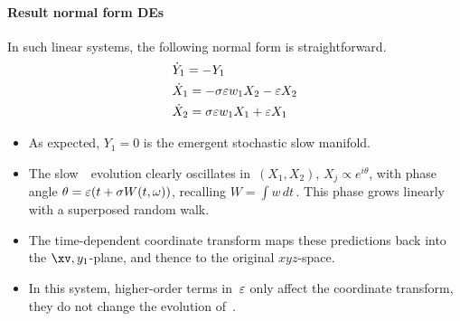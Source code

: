 \paragraph{Result normal form DEs}
In such linear systems, the following normal form is straightforward.
\begin{align*}&
\dot Y_{1}=-Y_{1}
\\&
\dot X_{1}=-\sigma  \varepsilon w_{1} X_{2}-\varepsilon X_{2}
\\&
\dot X_{2}=\sigma  \varepsilon w_{1} X_{1}+\varepsilon X_{1}
\end{align*}
\begin{itemize}
\item As expected, \(Y_1=0\) is the emergent stochastic slow manifold.
\item The slow~\Xv\ evolution clearly oscillates in~$(X_1,X_2)$, \(X_j\propto e^{i\theta}\), with phase angle $\theta=\varepsilon (t+\sigma W(t,\omega))$, recalling \(W=\int w\,dt\)\,.  This phase grows linearly with a superposed random walk.
\item The time-dependent coordinate transform maps these predictions back into the \(\xv,y_1\)-plane, and thence to the original \(xyz\)-space.
\item In this system, higher-order terms in~\(\varepsilon\) only affect the coordinate transform, they do not change the evolution of~\Xv.
\end{itemize}


